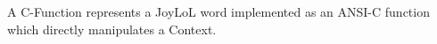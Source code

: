 
\startsection[title=Goals]

A C-Function represents a JoyLoL word implemented as an ANSI-C function 
which directly manipulates a Context. 